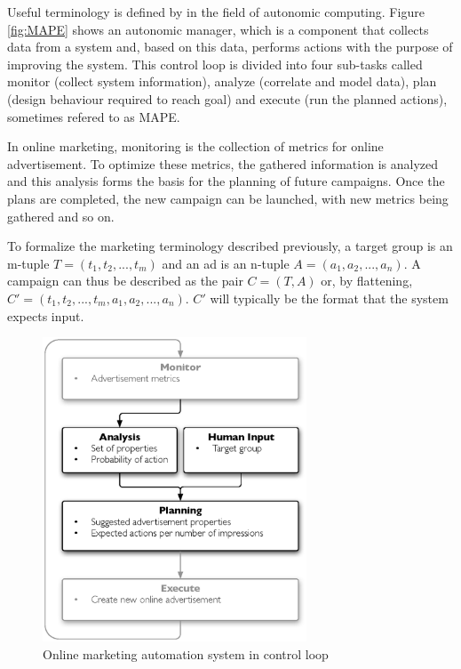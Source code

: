 \documentclass[a4paper]{article}
\begin{document}
Useful terminology is defined by \citet{IBM2006} in the field of autonomic computing. Figure \ref{fig:MAPE} shows an autonomic
manager, which is a component that collects data from a system and, based on this data, performs actions with the purpose of
improving the system. This control loop is divided into four sub-tasks called monitor (collect system information), analyze
(correlate and model data), plan (design behaviour required to reach goal) and execute (run the planned actions), sometimes
refered to as MAPE.

In online marketing, monitoring is the collection of metrics for online advertisement. To optimize these metrics, the gathered
information is analyzed and this analysis forms the basis for the planning of future campaigns. Once the plans are completed, the
new campaign can be launched, with new metrics being gathered and so on.

To formalize the marketing terminology described previously, a target group is an m-tuple \(T = (t_1, t_2, ..., t_m)\) and an ad is an n-tuple \(A = (a_1, a_2, ..., a_n)\). A campaign can thus be described as the pair \(C = (T, A)\) or, by flattening, \(C' = (t_1, t_2, ..., t_m, a_1, a_2, ..., a_n)\). \(C'\) will typically be the format that the system expects input.

\begin{figure}[h!]
\centering
\includegraphics[width=0.7\textwidth]{mape-marketing.eps}
\caption{Online marketing automation system in control loop}
\label{fig:MAPEMarketing}
\end{figure}
\end{document}
